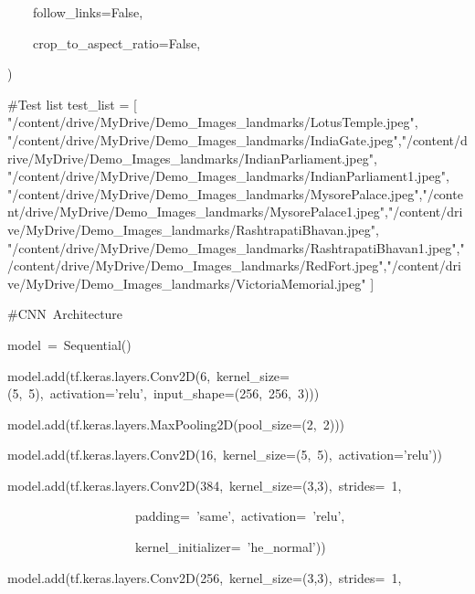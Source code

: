 \documentclass[10pt]{article} %
\begin{document}
\begin{spacing}{1.5}
\noindent ~~~~follow\_links=False,

\noindent ~~~~crop\_to\_aspect\_ratio=False,

\noindent )

\noindent 

\noindent 

\noindent \#Test list 
\justifying
\noindent test\_list = [ "/content/drive/MyDrive/Demo\_Images\_landmarks/LotusTemple.jpeg",\newline
"/content/drive/MyDrive/Demo\_Images\_landmarks/IndiaGate.jpeg",\newline "/content/drive/MyDrive/Demo\_Images\_landmarks/IndianParliament.jpeg",\newline
"/content/drive/MyDrive/Demo\_Images\_landmarks/IndianParliament1.jpeg",\newline
"/content/drive/MyDrive/Demo\_Images\_landmarks/MysorePalace.jpeg",\newline "/content/drive/MyDrive/Demo\_Images\_landmarks/MysorePalace1.jpeg",\newline "/content/drive/MyDrive/Demo\_Images\_landmarks/RashtrapatiBhavan.jpeg",\newline
"/content/drive/MyDrive/Demo\_Images\_landmarks/RashtrapatiBhavan1.jpeg",\newline "/content/drive/MyDrive/Demo\_Images\_landmarks/RedFort.jpeg",\newline "/content/drive/MyDrive/Demo\_Images\_landmarks/VictoriaMemorial.jpeg" ]

\noindent 

\noindent \#CNN~Architecture

\noindent model~=~Sequential()

\noindent model.add(tf.keras.layers.Conv2D(6,~kernel\_size=(5,~5),~activation='relu',~input\_shape=(256,~256,~3)))

\noindent model.add(tf.keras.layers.MaxPooling2D(pool\_size=(2,~2)))

\noindent model.add(tf.keras.layers.Conv2D(16,~kernel\_size=(5,~5),~activation='relu'))

\noindent model.add(tf.keras.layers.Conv2D(384,~kernel\_size=(3,3),~strides=~1,

\noindent ~~~~~~~~~~~~~~~~~~~~padding=~'same',~activation=~'relu',

\noindent ~~~~~~~~~~~~~~~~~~~~kernel\_initializer=~'he\_normal'))

\noindent 

\noindent model.add(tf.keras.layers.Conv2D(256,~kernel\_size=(3,3),~strides=~1,


\end{spacing}
\end{document}
